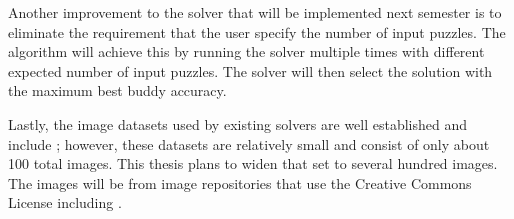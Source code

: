 \documentclass{report}
\begin{document}
Another improvement to the solver that will be implemented next semester is to eliminate the requirement that the user specify the number of input puzzles.  The algorithm will achieve this by running the solver multiple times with different expected number of input puzzles.  The solver will then select the solution with the maximum best buddy accuracy.

Lastly, the image datasets used by existing solvers are well established and include \cite{sholomonBenchmarkImages, cho2010, pomeranzBenchmarkImages}; however, these datasets are relatively small and consist of only about 100 total images.  This thesis plans to widen that set to several hundred images.  The images will be from image repositories that use the Creative Commons License including \cite{mcgillImageDatabase, pixabay}.






\pagebreak


\end{document}
